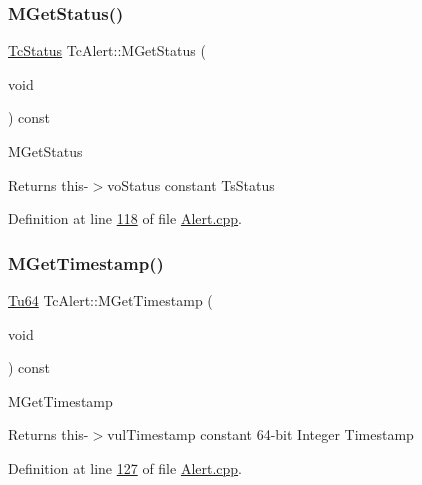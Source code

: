 \subsubsection{\texorpdfstring{M\+Get\+Status()}{MGetStatus()}}
{\footnotesize\ttfamily \mbox{\hyperlink{class_g_n_common_1_1_n_notification_1_1_tc_status}{Tc\+Status}} Tc\+Alert\+::\+M\+Get\+Status (\begin{DoxyParamCaption}\item[{void}]{ }\end{DoxyParamCaption}) const}

M\+Get\+Status \begin{DoxyReturn}{Returns}
this-\/$>$vo\+Status constant Ts\+Status 
\end{DoxyReturn}


Definition at line \mbox{\hyperlink{_alert_8cpp_source_l00118}{118}} of file \mbox{\hyperlink{_alert_8cpp_source}{Alert.\+cpp}}.

\mbox{\label{class_g_n_common_1_1_n_notification_1_1_tc_alert_a99c02af9bf2a17a34810ac5ed6be8856}} 
\subsubsection{\texorpdfstring{M\+Get\+Timestamp()}{MGetTimestamp()}}
{\footnotesize\ttfamily \mbox{\hyperlink{namespace_g_n_common_a9404ee6090c788ae70aebd1436ceb97d}{Tu64}} Tc\+Alert\+::\+M\+Get\+Timestamp (\begin{DoxyParamCaption}\item[{void}]{ }\end{DoxyParamCaption}) const}

M\+Get\+Timestamp \begin{DoxyReturn}{Returns}
this-\/$>$vul\+Timestamp constant 64-\/bit Integer Timestamp 
\end{DoxyReturn}


Definition at line \mbox{\hyperlink{_alert_8cpp_source_l00127}{127}} of file \mbox{\hyperlink{_alert_8cpp_source}{Alert.\+cpp}}.

\mbox{\label{class_g_n_common_1_1_n_notification_1_1_tc_alert_af4dccb7b428fdd2069a9dd1e6c12410b}} 
